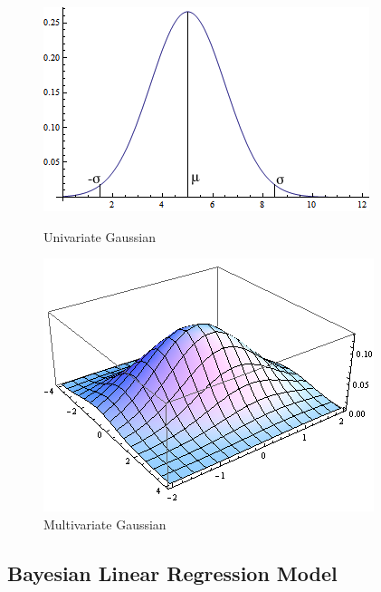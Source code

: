 \documentclass[english]{tktltiki}
\begin{document}
\begin{figure}
\centering
\begin{minipage}{.5\linewidth}
  \centering
  \includegraphics[width=\linewidth]{gp_1d.png}
  \caption{Univariate Gaussian}
  \label{fig:gaussian_1d}
\end{minipage}%
\begin{minipage}{.41\linewidth}
  \centering
  \includegraphics[width=\linewidth]{gp_2d.png}
  \caption{Multivariate Gaussian}
  \label{fig:gaussian_2d}
\end{minipage}

\label{fig:test}
\end{figure}


\subsection{Bayesian Linear Regression Model}
\end{document}
